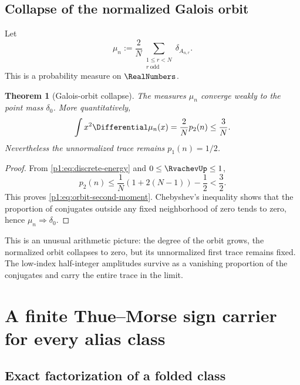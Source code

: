 \documentclass[11pt,oneside]{article}
\newtheorem{theorem}{Theorem}[section]
\theoremstyle{definition}
\theoremstyle{remark}
\begin{document}
\subsection{Collapse of the normalized Galois orbit}

Let
\begin{equation}\label{p1:eq:empirical-measure}
 \mu_n:=\frac2N
 \sum_{\substack{1\le r<N\\r\ \mathrm{odd}}}\delta_{A_{n,r}}.
\end{equation}
This is a probability measure on $\RealNumbers$.

\begin{theorem}[Galois-orbit collapse]\label{p1:thm:orbit-collapse}
The measures $\mu_n$ converge weakly to the point mass $\delta_0$.  More
quantitatively,
\begin{equation}\label{p1:eq:orbit-second-moment}
 \int x^2\Differential\mu_n(x)=\frac2N p_2(n)\le\frac3N.
\end{equation}
Nevertheless the unnormalized trace remains $p_1(n)=1/2$.
\end{theorem}

\begin{proof}
From \eqref{p1:eq:discrete-energy} and $0\le\RvachevUp\le1$,
\[
 p_2(n)\le\frac1N(1+2(N-1))-\frac12<\frac32.
\]
This proves \eqref{p1:eq:orbit-second-moment}.  Chebyshev's inequality shows that
the proportion of conjugates outside any fixed neighborhood of zero tends to
zero, hence $\mu_n\Rightarrow\delta_0$.
\end{proof}

\begin{remark}
This is an unusual arithmetic picture: the degree of the orbit grows, the
normalized orbit collapses to zero, but its unnormalized first trace remains
fixed.  The low-index half-integer amplitudes survive as a vanishing proportion
of the conjugates and carry the entire trace in the limit.
\end{remark}

\section{A finite Thue--Morse sign carrier for every alias class}\label{p1:sec:sign-carrier}

\subsection{Exact factorization of a folded class}
\end{document}
